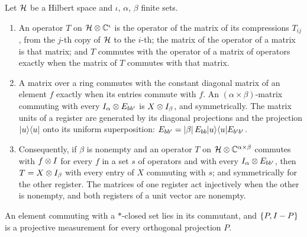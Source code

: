 \begin{lemma}
\label{lem:ampl-commutant}
\leanok
Let $\mathcal{H}$ be a Hilbert space and $\iota$, $\alpha$, $\beta$ finite sets.
\begin{enumerate}
  \item An operator $T$ on $\mathcal{H} \otimes \mathbb{C}^\iota$ is the operator of the matrix of its compressions
    $T_{ij}$, from the $j$-th copy of $\mathcal{H}$ to the $i$-th; the matrix of the operator of a matrix is
    that matrix; and $T$ commutes with the operator of a matrix of operators exactly when the matrix
    of $T$ commutes with that matrix.
  \item A matrix over a ring commutes with the constant diagonal matrix of an element $f$ exactly
    when its entries commute with $f$. An $(\alpha \times \beta)$-matrix commuting with every
    $I_\alpha \otimes E_{bb'}$ is $X \otimes I_\beta$, and symmetrically. The matrix units of a
    register are generated by its diagonal projections and the projection $|u\rangle\langle u|$ onto its
    uniform superposition: $E_{bb'} = |\beta|\, E_{bb} |u\rangle\langle u| E_{b'b'}$.
  \item Consequently, if $\beta$ is nonempty and an operator $T$ on $\mathcal{H} \otimes \mathbb{C}^{\alpha \times
    \beta}$ commutes with $f \otimes I$ for every $f$ in a set $s$ of operators and with every
    $I_\alpha \otimes E_{bb'}$, then $T = X \otimes I_\beta$ with every entry of $X$ commuting
    with $s$; and symmetrically for the other register. The matrices of one register act injectively
    when the other is nonempty, and both registers of a unit vector are nonempty.
\end{enumerate}
An element commuting with a $*$-closed set lies in its commutant, and $\{P, I - P\}$ is a
projective measurement for every orthogonal projection $P$.
\end{lemma}


